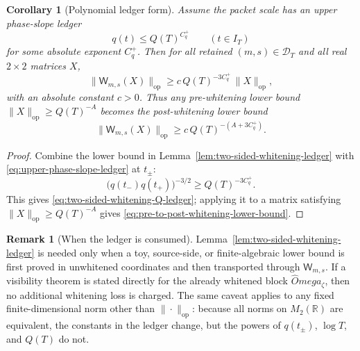 \documentclass[11pt,a4paper]{amsart}
\def\Omega{Omega}%
\numberwithin{equation}{section}
\theoremstyle{plain}
\newtheorem{corollary}[theorem]{Corollary}
\theoremstyle{definition}
\newtheorem{remark}[theorem]{Remark}
\newcommand{\z}{\zeta}
\newcommand{\Om}{\Omega}
\newcommand{\op}{\mathrm{op}}
\begin{document}
\begin{corollary}[Polynomial ledger form]
\label{cor:two-sided-whitening-polynomial-ledger}
Assume the packet scale has an upper phase-slope ledger
\begin{equation}
\label{eq:upper-phase-slope-ledger}
        q(t)\le Q(T)^{C_q^+}
        \qquad (t\in I_T)
\end{equation}
for some absolute exponent \(C_q^+\).  Then for all retained
\((m,s)\in\mathcal D_T\) and all real \(2\times2\) matrices \(X\),
\begin{equation}
\label{eq:two-sided-whitening-Q-ledger}
        \|\mathsf W_{m,s}(X)\|_{\op}
        \ge
        c\,Q(T)^{-3C_q^+}\,\|X\|_{\op},
\end{equation}
with an absolute constant \(c>0\).  Thus any pre-whitening lower bound
\(\|X\|_{\op}\ge Q(T)^{-A}\) becomes the post-whitening lower bound
\begin{equation}
\label{eq:pre-to-post-whitening-lower-bound}
        \|\mathsf W_{m,s}(X)\|_{\op}
        \ge c\,Q(T)^{-(A+3C_q^+)}.
\end{equation}
\end{corollary}

\begin{proof}
Combine the lower bound in Lemma~\ref{lem:two-sided-whitening-ledger} with
\eqref{eq:upper-phase-slope-ledger} at \(t_\pm\):
\[
        \bigl(q(t_-)q(t_+)\bigr)^{-3/2}
        \ge Q(T)^{-3C_q^+}.
\]
This gives \eqref{eq:two-sided-whitening-Q-ledger}; applying it to a
matrix satisfying \(\|X\|_{\op}\ge Q(T)^{-A}\) gives
\eqref{eq:pre-to-post-whitening-lower-bound}.
\end{proof}

\begin{remark}[When the ledger is consumed]
\label{rem:when-two-sided-whitening-ledger-is-consumed}
Lemma~\ref{lem:two-sided-whitening-ledger} is needed only when a toy,
source-side, or finite-algebraic lower bound is first proved in
unwhitened coordinates and then transported through
\(\mathsf W_{m,s}\).  If a visibility theorem is stated directly for the
already whitened block \(\widehat\Om_\z\), then no additional whitening
loss is charged.  The same caveat applies to any fixed finite-dimensional
norm other than \(\|\cdot\|_{\op}\): because all norms on \(M_2(\mathbb R)\)
are equivalent, the constants in the ledger change, but the powers of
\(q(t_\pm)\), \(\log T\), and \(Q(T)\) do not.
\end{remark}

\end{document}
